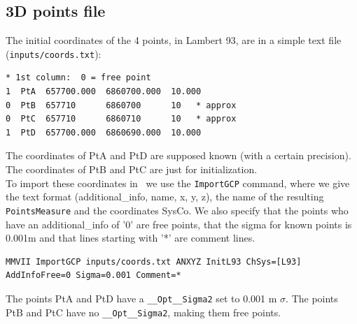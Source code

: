 
\subsection{3D points file}
The initial coordinates of the 4 points, in Lambert 93, are in a simple text file (\texttt{inputs/coords.txt}):

\begin{verbatim}
* 1st column:  0 = free point
1  PtA  657700.000  6860700.000  10.000
0  PtB  657710      6860700      10   * approx
0  PtC  657710      6860710      10   * approx
1  PtD  657700.000  6860690.000  10.000
\end{verbatim}

The coordinates of PtA and PtD are supposed known (with a certain precision).
The coordinates of PtB and PtC are just for initialization.
\\

To import these coordinates in \CdPPP\ we use the \texttt{ImportGCP} command, where we give the text format
(additional\_info, name, x, y, z), the name of the resulting \texttt{PointsMeasure} and the coordinates SysCo.
We also specify that the points who have an additional\_info of '0' are free points, that the sigma for
known points is 0.001m and that lines starting with '*' are comment lines.

\begin{lstlisting}
MMVII ImportGCP inputs/coords.txt ANXYZ InitL93 ChSys=[L93] AddInfoFree=0 Sigma=0.001 Comment=*
\end{lstlisting}


The points PtA and PtD have a \texttt{\_\_Opt\_\_Sigma2} set to 0.001 m $\sigma$.
The points PtB and PtC have no \texttt{\_\_Opt\_\_Sigma2}, making them free points.

